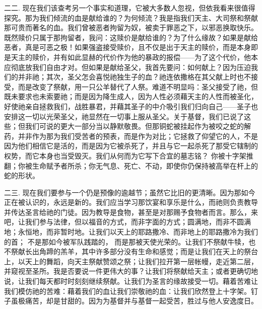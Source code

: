二二. 现在我们该查考另一个事实和道理，它被大多数人忽视，但依我看来很值得探究。那为我们倾流的血是献给谁的？为何倾流？我是指我们天主、大司祭和祭献那可贵而著名的血。我们曾被恶者拘留为奴，被卖于罪恶之下，以邪恶换取快乐。既然赎价只属于那拘留者，我问：这赎价是献给谁的？为了什么缘故？如果是献给恶者，真是可恶之极！如果强盗接受赎价，且不仅是出于天主的赎价，而是本身即是天主的赎价，并有如此显赫的代价作为他的暴政的报偿——为了这个代价，他本应彻底放我们自由才对。但如果是献给圣父，我首先要问：如何献上？因为压迫我们的并非祂；其次，圣父怎会喜悦祂独生子的血？祂连依撒格在其父献上时也不接受，而是改变了祭献，用一只公羊替代了人祭。难道不明显吗：圣父接受了祂，但既未要求也未索要祂；而是因为降生成人，因为人性必须藉天主的人性而被圣化，好使祂亲自拯救我们，战胜暴君，并藉其圣子的中介吸引我们归向自己——圣子也安排这一切以光荣圣父，祂显然在一切事上服从圣父。关于基督，我们已说了这些；但我们可说的更大一部分当以静默敬畏。但那铜蛇被挂起作为被咬之蛇的解药，并非作为那为我们受苦者的预表，而是作为对比；它拯救了仰望它的人，不是因为他们相信它是活的，而是因为它被杀死了，并且与它一起杀死了那受它辖制的权势，而它本身也当受毁灭。我们从何而为它写下合宜的墓志铭？ 你被十字架推翻；你被生命赋予者所杀；你无气息、死亡、不动，即使你仍保持被高举在杆上的蛇的形状。\par

二三. 现在我们要参与一个仍是预像的逾越节；虽然它比旧的更清晰。因为那如今正在被认识的，永远是新的。我们应当学习那饮宴和享乐是什么，而祂则负责教导并传达圣言给祂的门徒。因为教导是食物，甚至是对那赐予食物者而言。那么，来吧，让我们参与法律，但以福音的方式，而非字面的方式；圆满地，而非不圆满地；永恒地，而非暂时地。让我们以天上的耶路撒冷、而非地上的耶路撒冷为我们的首； 不是那如今被军队践踏的， 而是那被天使光荣的。让我们不祭献牛犊，也不祭献长出角蹄的羔羊，其中许多部分没有生命和感觉；而是让我们在天上的祭台上，以天上的舞蹈，向天主祭献赞颂之祭；让我们拉开第一层帐幔，走近第二层，并窥视至圣所。我是否要说一件更伟大的事？让我们将祭献给天主；或者更确切地说，让我们每天都时时刻刻继续祭献。让我们为圣言的缘故接受一切。藉着苦难让我们模仿祂的苦难：藉着我们的血让我们崇敬祂的血：让我们欣然登上十字架。钉子虽极痛苦，却是甘甜的。因为为基督并与基督一起受苦，胜过与他人安逸度日。\par

